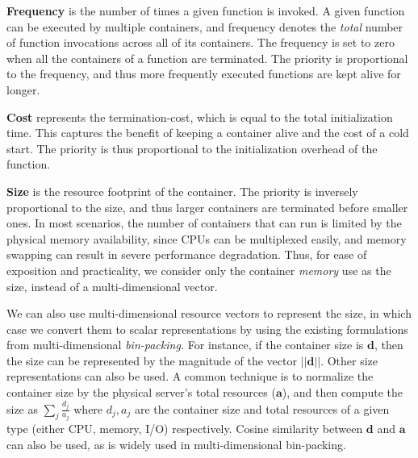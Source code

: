 \noindent \textbf{Frequency} is the number of times a given function is invoked.
A given function can be executed by multiple containers, and frequency denotes the \emph{total} number of function invocations across all of its containers. 
The frequency is set to zero when all the containers of a function are terminated.
The priority is proportional to the frequency, and thus more frequently executed functions are kept alive for longer. 
%
%


\noindent \textbf{Cost} represents the termination-cost, which is equal to the total initialization time. 
This captures the benefit of keeping a container alive and the cost of a cold start. 
The priority is thus proportional to the initialization overhead of the function. 



\noindent \textbf{Size} is the resource footprint of the container. 
The priority is inversely proportional to the size, and thus larger containers are terminated before smaller ones. 
In most scenarios, the number of containers that can run is limited by the physical memory availability, since CPUs can be multiplexed easily, and memory swapping can result in severe performance degradation.
Thus, for ease of exposition and practicality, we consider only the container \emph{memory} use as the size, instead of a multi-dimensional vector. 


We can also use multi-dimensional resource vectors to represent the size, in which case we convert them to scalar representations by using the existing formulations from multi-dimensional \emph{bin-packing.}
For instance, if the container size is $\mathbf{d}$, then the size can be represented by the magnitude of the vector $||\mathbf{d}||$.
Other size representations can also be used.
A common technique is to normalize the container size by the physical server's total resources ($\mathbf{a}$), and then compute the size as $\sum_j \frac{d_j}{a_j}$ where $d_j, a_j$ are the container size and total resources of a given type (either CPU, memory, I/O) respectively.
Cosine similarity between $\mathbf{d}$ and $\mathbf{a}$ can also be used, as is widely used in multi-dimensional bin-packing.  


